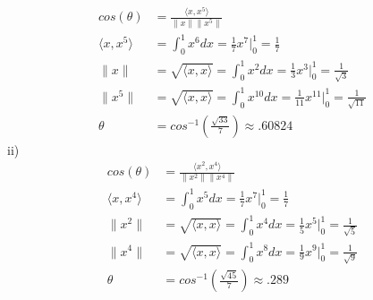 \documentclass[letterpaper,12pt]{article}
\theoremstyle{definition}
\begin{document}
\\

\begin{align*}
cos(\theta)& = \frac{\langle x,x^{5}\rangle }{\|x\|\|x^{5}\|} \\
\langle x,x^{5}\rangle  &= \int^{1}_{0} x^{6} dx = \frac{1}{7}x^{7} |_{0}^{1} = \frac{1}{7} \\
\|x\| &= \sqrt{\langle x,x\rangle } = \int^{1}_{0} x^{2} dx = \frac{1}{3}x^{3} |_{0}^{1} = \frac{1}{\sqrt{3}} \\ 
\|x^{5}\| &= \sqrt{\langle x,x\rangle } = \int^{1}_{0} x^{10} dx = \frac{1}{11}x^{11} |_{0}^{1} = \frac{1}{\sqrt{11}} \\ 
\theta &= cos^{-1}(\frac{\sqrt{33}}{7}) \approx .60824
\end{align*}
ii)
\begin{align*}
cos(\theta)& = \frac{\langle x^{2},x^{4}\rangle }{\|x^{2}\|\|x^{4}\|} \\
\langle x,x^{4}\rangle  &= \int^{1}_{0} x^{5} dx = \frac{1}{7}x^{7} |_{0}^{1} = \frac{1}{7} \\
\|x^{2}\| &= \sqrt{\langle x,x\rangle } = \int^{1}_{0} x^{4} dx = \frac{1}{5}x^{5} |_{0}^{1} = \frac{1}{\sqrt{5}} \\ 
\|x^{4}\| &= \sqrt{\langle x,x\rangle } = \int^{1}_{0} x^{8} dx = \frac{1}{9}x^{9} |_{0}^{1} = \frac{1}{\sqrt{9}} \\ 
\theta &= cos^{-1}(\frac{\sqrt{45}}{7}) \approx .289
\end{align*}
\end{document}
